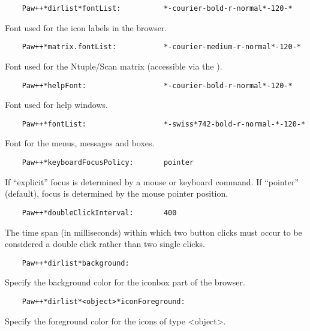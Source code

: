 \begin{verbatim}
    Paw++*dirlist*fontList:          *-courier-bold-r-normal*-120-*
\end{verbatim}

   Font used for the icon labels in the browser.

\begin{verbatim}
    Paw++*matrix.fontList:           *-courier-medium-r-normal*-120-*
\end{verbatim}

   Font used for the Ntuple/Scan matrix (accessible via the \NV).

\begin{verbatim}
    Paw++*helpFont:                  *-courier-bold-r-normal*-120-*
\end{verbatim}

   Font used for help windows.

\begin{verbatim}
    Paw++*fontList:                  *-swiss*742-bold-r-normal-*-120-*
\end{verbatim}

   Font for the menus, messages and boxes.

\begin{verbatim}
    Paw++*keyboardFocusPolicy:       pointer
\end{verbatim}

   If ``explicit'' focus is determined by a mouse or keyboard command.  If
   ``pointer'' (default), focus is determined by the mouse pointer position.

\begin{verbatim}
    Paw++*doubleClickInterval:       400
\end{verbatim}

   The time span (in milliseconds) within which two button clicks must occur
   to be considered a double click rather than two single clicks.

\begin{verbatim}
    Paw++*dirlist*background:
\end{verbatim}

   Specify the background color for the iconbox part of the browser.

\begin{verbatim}
    Paw++*dirlist*<object>*iconForeground:
\end{verbatim}

   Specify the foreground color for the icons of type <object>.

